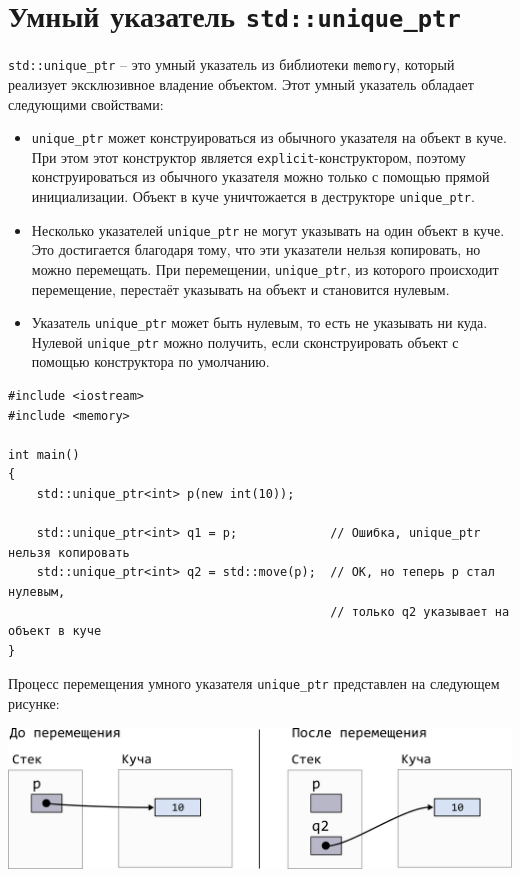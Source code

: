 \documentclass{article}
\begin{document}
\section*{Умный указатель \texttt{std::unique\_ptr}}
\texttt{std::unique\_ptr} -- это умный указатель из библиотеки \texttt{memory}, который реализует эксклюзивное владение объектом. Этот умный указатель обладает следующими свойствами:
\begin{itemize}
\item \texttt{unique\_ptr} может конструироваться из обычного указателя на объект в куче. При этом этот конструктор является \texttt{explicit}-конструктором, поэтому конструироваться из обычного указателя можно только с помощью прямой инициализации. Объект в куче уничтожается в деструкторе \texttt{unique\_ptr}.
\item Несколько указателей \texttt{unique\_ptr} не могут указывать на один объект в куче. Это достигается благодаря тому, что эти указатели нельзя копировать, но можно перемещать. При перемещении, \texttt{unique\_ptr}, из которого происходит перемещение, перестаёт указывать на объект и становится нулевым.
\item Указатель \texttt{unique\_ptr} может быть нулевым, то есть не указывать ни куда. Нулевой \texttt{unique\_ptr} можно получить, если сконструировать объект с помощью конструктора по умолчанию.
\end{itemize}

\begin{lstlisting}
#include <iostream>
#include <memory>

int main()
{
	std::unique_ptr<int> p(new int(10));
	
	std::unique_ptr<int> q1 = p;             // Ошибка, unique_ptr нельзя копировать
	std::unique_ptr<int> q2 = std::move(p);  // ОК, но теперь p стал нулевым, 
	                                         // только q2 указывает на объект в куче
}
\end{lstlisting}


Процесс перемещения умного указателя \texttt{unique\_ptr} представлен на следующем рисунке:

\begin{center}
\includegraphics[scale=1]{../images/move_unique_ptr.png}
\end{center}
\end{document}
